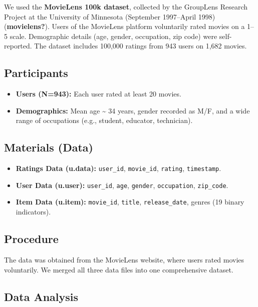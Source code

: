 \documentclass[
  man]{apa6}
\providecommand{\tightlist}{%
  \setlength{\itemsep}{0pt}\setlength{\parskip}{0pt}}
\begin{document}
We used the \textbf{MovieLens 100k dataset}, collected by the GroupLens Research Project at the University of Minnesota (September 1997--April 1998) (\textbf{movielens?}). Users of the MovieLens platform voluntarily rated movies on a 1--5 scale. Demographic details (age, gender, occupation, zip code) were self-reported. The dataset includes 100,000 ratings from 943 users on 1,682 movies.

\subsection{Participants}\label{participants}

\begin{itemize}
\tightlist
\item
  \textbf{Users (N=943):} Each user rated at least 20 movies.
\item
  \textbf{Demographics:} Mean age \textasciitilde{} 34 years, gender recorded as M/F, and a wide range of occupations (e.g., student, educator, technician).
\end{itemize}

\subsection{Materials (Data)}\label{materials-data}

\begin{itemize}
\tightlist
\item
  \textbf{Ratings Data (u.data):} \texttt{user\_id}, \texttt{movie\_id}, \texttt{rating}, \texttt{timestamp}.
\item
  \textbf{User Data (u.user):} \texttt{user\_id}, \texttt{age}, \texttt{gender}, \texttt{occupation}, \texttt{zip\_code}.
\item
  \textbf{Item Data (u.item):} \texttt{movie\_id}, \texttt{title}, \texttt{release\_date}, genres (19 binary indicators).
\end{itemize}

\subsection{Procedure}\label{procedure}

The data was obtained from the MovieLens website, where users rated movies voluntarily. We merged all three data files into one comprehensive dataset.

\subsection{Data Analysis}\label{data-analysis}
\end{document}
